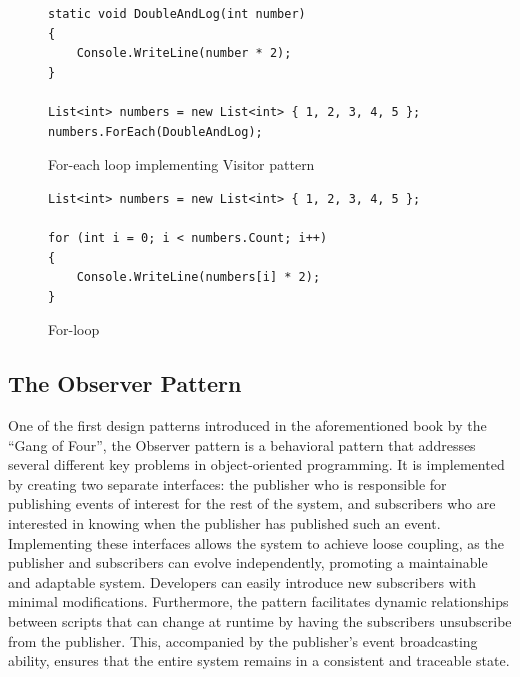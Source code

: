 \begin{figure}[!ht]
    \begin{lstlisting}[style=csharp]
static void DoubleAndLog(int number)
{
    Console.WriteLine(number * 2);
}

List<int> numbers = new List<int> { 1, 2, 3, 4, 5 };
numbers.ForEach(DoubleAndLog);
    \end{lstlisting}
    \caption{For-each loop implementing Visitor pattern}
    \label{fig:visitor-pattern-example}
\end{figure}

\begin{figure}[!ht]
    \begin{lstlisting}[style=csharp]
List<int> numbers = new List<int> { 1, 2, 3, 4, 5 };

for (int i = 0; i < numbers.Count; i++)
{
    Console.WriteLine(numbers[i] * 2);
}
    \end{lstlisting}
    \caption{For-loop}
    \label{fig:for-loop-example}
\end{figure}

\subsection{The Observer Pattern}
One of the first design patterns introduced in the aforementioned book by the “Gang of Four”, the Observer pattern is a behavioral pattern that addresses several different key problems in object-oriented programming\cite{gameprogpatterns-observer}. It is implemented by creating two separate interfaces: the publisher who is responsible for publishing events of interest for the rest of the system, and subscribers who are interested in knowing when the publisher has published such an event. Implementing these interfaces allows the system to achieve loose coupling, as the publisher and subscribers can evolve independently, promoting a maintainable and adaptable system. Developers can easily introduce new subscribers with minimal modifications. Furthermore, the pattern facilitates dynamic relationships between scripts that can change at runtime by having the subscribers unsubscribe from the publisher. This, accompanied by the publisher's event broadcasting ability, ensures that the entire system remains in a consistent and traceable state. 

